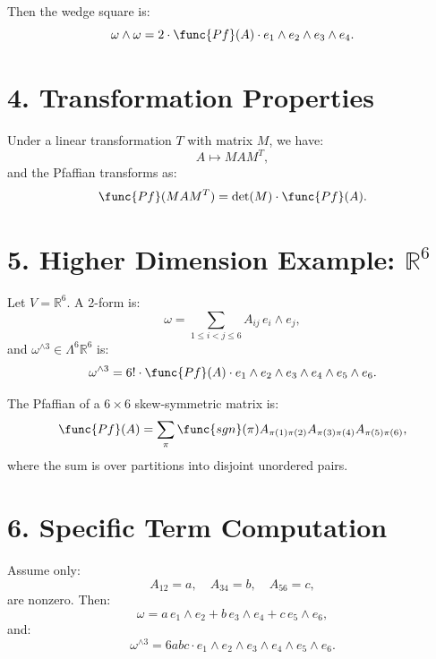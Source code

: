 \documentclass[aps,prd,onecolumn,notitlepage,nofootinbib]{revtex4-2}
\begin{document}
Then the wedge square is: 
\begin{equation}
\omega \wedge \omega = 2 \cdot \func{Pf}(A) \cdot e_1 \wedge e_2 \wedge e_3
\wedge e_4.
\end{equation}

\section*{4. Transformation Properties}

Under a linear transformation $T $ with matrix $M $, we have: 
\begin{equation}
A \mapsto M A M^T,
\end{equation}
and the Pfaffian transforms as: 
\begin{equation}
\func{Pf}(M A M^T) = \det(M) \cdot \func{Pf}(A).
\end{equation}

\section*{5. Higher Dimension Example: $\mathbb{R}^6 $}

Let $V = \mathbb{R}^6 $. A 2-form is: 
\begin{equation}
\omega = \sum_{1 \le i < j \le 6} A_{ij} \, e_i \wedge e_j,
\end{equation}
and $\omega^{\wedge 3} \in \Lambda^6 \mathbb{R}^6 $ is: 
\begin{equation}
\omega^{\wedge 3} = 6! \cdot \func{Pf}(A) \cdot e_1 \wedge e_2 \wedge e_3
\wedge e_4 \wedge e_5 \wedge e_6.
\end{equation}

The Pfaffian of a $6 \times 6 $ skew-symmetric matrix is: 
\begin{equation}
\func{Pf}(A) = \sum_{\pi} \func{sgn}(\pi) A_{\pi(1)\pi(2)} A_{\pi(3)\pi(4)}
A_{\pi(5)\pi(6)},
\end{equation}
where the sum is over partitions into disjoint unordered pairs.

\section*{6. Specific Term Computation}

Assume only: 
\begin{equation}
A_{12} = a, \quad A_{34} = b, \quad A_{56} = c,
\end{equation}
are nonzero. Then: 
\begin{equation}
\omega = a \, e_1 \wedge e_2 + b \, e_3 \wedge e_4 + c \, e_5 \wedge e_6,
\end{equation}
and: 
\begin{equation}
\omega^{\wedge 3} = 6abc \cdot e_1 \wedge e_2 \wedge e_3 \wedge e_4 \wedge
e_5 \wedge e_6.
\end{equation}
\end{document}
